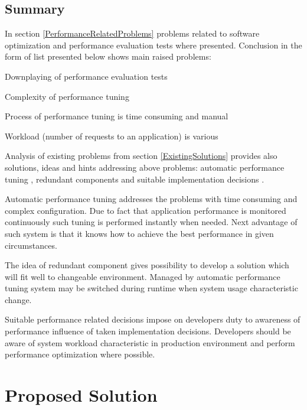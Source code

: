 \documentclass[12pt,a4paper]{article}
\let\tempone\itemize
\let\temptwo\enditemize
\renewenvironment{itemize}{\tempone\addtolength{\itemsep}{-0.4\baselineskip}}{\temptwo}
\begin{document}
\subsection{Summary}

In section \ref{PerformanceRelatedProblems} problems related to software optimization and performance evaluation tests where presented. Conclusion in the form of list presented below shows main raised problems:
\begin{itemize} 
\item Downplaying of performance evaluation tests \cite{artperformance}\cite{lssrarticle}
\item Complexity of performance tuning \cite{glassfishdoc}\cite{deployerproblem}
\item Process of performance tuning is time consuming and manual \cite{deployerproblem}
\item Workload (number of requests to an application) is various \cite{invariantsworkloads}
\end{itemize}

Analysis of existing problems from section \ref{ExistingSolutions} provides also solutions, ideas and hints addressing above problems:
automatic performance tuning \cite{autotuning}\cite{autoarch}\cite{autoframework}, redundant components \cite{redundancycomponent} and suitable implementation decisions \cite{springperformance}. 

Automatic performance tuning addresses the problems with time consuming and complex configuration. Due to fact that application performance is monitored continuously such tuning is performed instantly when needed. Next advantage of such system is that it knows how to achieve the best performance in given circumstances. 

The idea of redundant component gives possibility to develop a solution which will fit well to changeable environment. Managed by automatic performance tuning system may be switched during runtime when system usage characteristic change. 

Suitable performance related decisions impose on developers duty to awareness of performance influence of taken implementation decisions. Developers should be aware of system workload characteristic in production environment and perform performance optimization where possible. 
 
\section{Proposed Solution} \label{section:proposedsolution}
\end{document}
